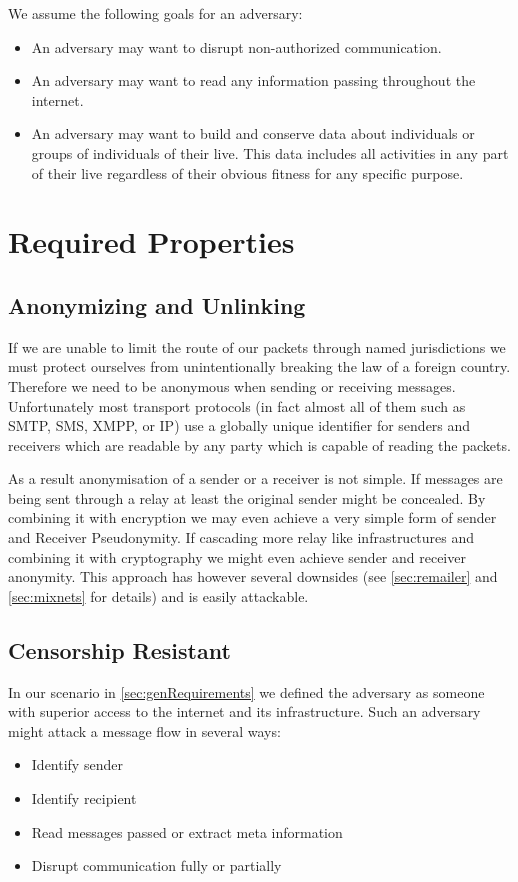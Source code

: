 We assume the following goals for an adversary:
\begin{itemize}
	\item An adversary may want to disrupt non-authorized communication.
	\item An adversary may want to read any information passing throughout the internet.
	\item An adversary may want to build and conserve data about individuals or groups of individuals of their live. This data includes all activities in any part of their live regardless of their obvious fitness for any specific purpose.
\end{itemize}

\section{Required Properties}

\subsection{Anonymizing and Unlinking}
If we are unable to limit the route of our packets through named jurisdictions we must protect ourselves from unintentionally breaking the law of a foreign country. Therefore we need to be anonymous when sending or receiving messages. Unfortunately most transport protocols (in fact almost all of them such as SMTP, SMS, XMPP, or IP) use a globally unique identifier for senders and receivers which are readable by any party which is capable of reading the packets. 

As a result anonymisation of a sender or a receiver is not simple. If messages are being sent through a relay at least the original sender might be concealed. By combining it with encryption we may even achieve a very simple form of sender and Receiver Pseudonymity. If cascading more relay like infrastructures and combining it with cryptography we might even achieve sender and receiver anonymity. This approach has however several downsides (see \ref{sec:remailer} and \ref{sec:mixnets} for details) and is easily attackable.

\subsection{Censorship Resistant}
In our scenario in \ref{sec:genRequirements} we defined the adversary as someone with superior access to the internet and its infrastructure. Such an adversary might attack a message flow in several ways:
\begin{itemize}
	\item Identify sender
	\item Identify recipient
	\item Read messages passed or extract meta information
	\item Disrupt communication fully or partially
\end{itemize}

